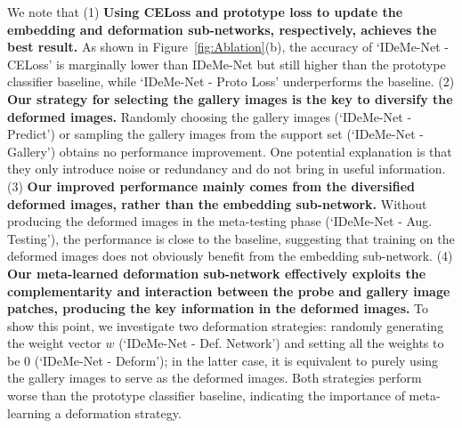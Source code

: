 \documentclass[10pt,letterpaper,twocolumn]{article}
\begin{document}
We note that (1) \textbf{Using CELoss and prototype loss to update
the embedding and deformation sub-networks, respectively,
achieves the best result.} As shown in Figure~\ref{fig:Ablation}(b),
the accuracy of `IDeMe-Net - CELoss' is marginally lower than IDeMe-Net
but still higher than the prototype classifier baseline, while
`IDeMe-Net - Proto Loss' underperforms the baseline. (2) \textbf{Our
strategy for selecting the gallery images is the key to diversify
the deformed images.} Randomly choosing the gallery
images (`IDeMe-Net - Predict') or sampling
the gallery images from the support set (`IDeMe-Net - Gallery') obtains
no performance improvement. One potential explanation is that they
only introduce noise or redundancy and do not bring in useful information.
(3) \textbf{Our improved performance mainly comes from the diversified deformed
images, rather than the embedding sub-network.} Without producing
the deformed images in the meta-testing phase (`IDeMe-Net - Aug. Testing'),
the performance is close to the baseline, suggesting that training
on the deformed images does not obviously benefit from the embedding
sub-network. (4)
\textbf{Our meta-learned deformation sub-network effectively exploits
the complementarity and interaction between the probe and gallery
image patches, producing the key information in the deformed images.}
To show this point, we investigate two deformation strategies: randomly
generating the weight vector $w$ (`IDeMe-Net - Def. Network') and setting
all the weights to be 0 (`IDeMe-Net - Deform'); in the latter case, it
is equivalent to purely using the gallery images to serve as the deformed
images. Both strategies perform worse than the prototype classifier
baseline, indicating the importance of meta-learning a deformation
strategy.
\end{document}
